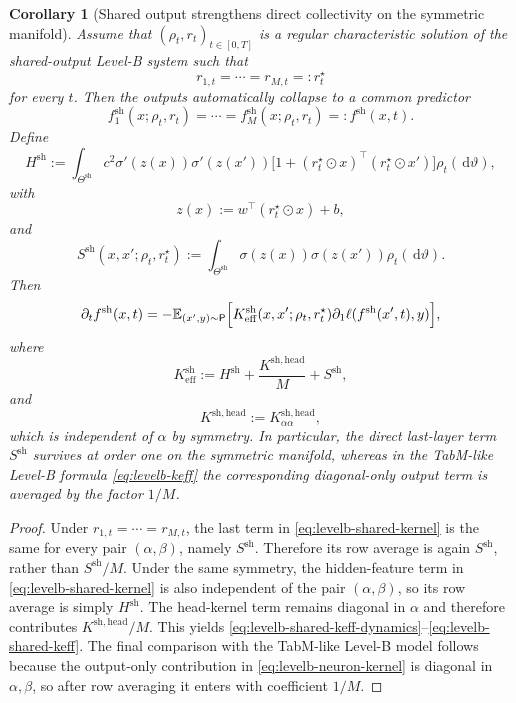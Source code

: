 \documentclass[11pt]{article}
\newtheorem{corollary}[theorem]{Corollary}
\theoremstyle{definition}
\newcommand{\E}{\mathbb{E}}
\newcommand{\dd}{\,\mathrm{d}}
\begin{document}
\begin{corollary}[Shared output strengthens direct collectivity on the symmetric manifold]
\label{cor:levelb-shared-collapsed}
Assume that $(\rho_t,r_t)_{t\in[0,T]}$ is a regular characteristic solution of the shared-output Level-B system such that
\[
  r_{1,t}=\cdots=r_{M,t}=:r_t^\star
\]
for every $t$.
Then the outputs automatically collapse to a common predictor
\[
  f_1^{\mathrm{sh}}(x;\rho_t,r_t)=\cdots=f_M^{\mathrm{sh}}(x;\rho_t,r_t)=:f^{\mathrm{sh}}(x,t).
\]
Define
\[
  H^{\mathrm{sh}}
  :=
  \int_{\Theta^{\mathrm{sh}}}
  c^2\sigma'(z(x))\sigma'(z(x'))
  \bigl[1+(r_t^\star\odot x)^\top(r_t^\star\odot x')\bigr]
  \rho_t(\dd \vartheta),
\]
with
\[
  z(x):=w^\top(r_t^\star\odot x)+b,
\]
and
\[
  S^{\mathrm{sh}}(x,x';\rho_t,r_t^\star)
  :=
  \int_{\Theta^{\mathrm{sh}}}
  \sigma(z(x))\sigma(z(x'))
  \rho_t(\dd \vartheta).
\]
Then
\begin{equation}
  \partial_t f^{\mathrm{sh}}(x,t)
  =
  -\E_{(x',y)\sim\mathsf P}
  \Bigl[
    K_{\mathrm{eff}}^{\mathrm{sh}}(x,x';\rho_t,r_t^\star)
    \partial_1\ell(f^{\mathrm{sh}}(x',t),y)
  \Bigr],
  \label{eq:levelb-shared-keff-dynamics}
\end{equation}
where
\begin{equation}
  K_{\mathrm{eff}}^{\mathrm{sh}}
  :=
  H^{\mathrm{sh}}
  +
  \frac{K^{\mathrm{sh,head}}}{M}
  +
  S^{\mathrm{sh}},
  \label{eq:levelb-shared-keff}
\end{equation}
and
\[
  K^{\mathrm{sh,head}}
  :=
  K_{\alpha\alpha}^{\mathrm{sh,head}},
\]
which is independent of $\alpha$ by symmetry.
In particular, the direct last-layer term $S^{\mathrm{sh}}$ survives at order one on the symmetric manifold, whereas in the TabM-like Level-B formula \cref{eq:levelb-keff} the corresponding diagonal-only output term is averaged by the factor $1/M$.
\end{corollary}

\begin{proof}
Under $r_{1,t}=\cdots=r_{M,t}$, the last term in \eqref{eq:levelb-shared-kernel} is the same for every pair $(\alpha,\beta)$, namely $S^{\mathrm{sh}}$.
Therefore its row average is again $S^{\mathrm{sh}}$, rather than $S^{\mathrm{sh}}/M$.
Under the same symmetry, the hidden-feature term in \eqref{eq:levelb-shared-kernel} is also independent of the pair $(\alpha,\beta)$, so its row average is simply $H^{\mathrm{sh}}$.
The head-kernel term remains diagonal in $\alpha$ and therefore contributes $K^{\mathrm{sh,head}}/M$.
This yields \eqref{eq:levelb-shared-keff-dynamics}--\eqref{eq:levelb-shared-keff}.
The final comparison with the TabM-like Level-B model follows because the output-only contribution in \cref{eq:levelb-neuron-kernel} is diagonal in $\alpha,\beta$, so after row averaging it enters with coefficient $1/M$.
\end{proof}
\end{document}
